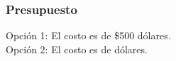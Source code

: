 \documentclass{beamer}
\begin{document}
\begin{frame}
    \frametitle{Presupuesto}
    Opción 1: El costo es de \$500 dólares. \\
    Opción 2: El costo es de  dólares.
\end{frame}
\end{document}
